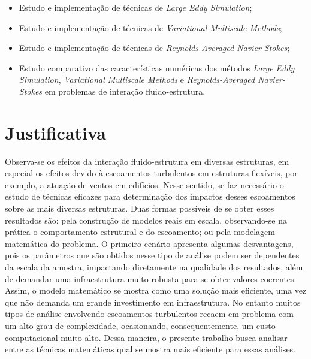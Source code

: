 \documentclass[_ArquivoPrincipal.tex]{subfiles}
\begin{document}
\begin{itemize}
    \item Estudo e implementação de técnicas de \textit{Large Eddy Simulation};

    \item Estudo e implementação de técnicas de \textit{Variational Multiscale Methods};

    \item Estudo e implementação de técnicas de \textit{Reynolds-Averaged Navier-Stokes};

    \item Estudo comparativo das características numéricas dos métodos \textit{Large Eddy Simulation}, \textit{Variational Multiscale Methods} e \textit{Reynolds-Averaged Navier-Stokes} em problemas de interação fluido-estrutura.
\end{itemize}

\section{Justificativa}

Observa-se os efeitos da interação fluido-estrutura em diversas estruturas, em especial os efeitos devido à escoamentos turbulentos em estruturas flexíveis, por exemplo, a atuação de ventos em edifícios. Nesse sentido, se faz necessário o estudo de técnicas eficazes para determinação dos impactos desses escoamentos sobre as mais diversas estruturas. Duas formas possíveis de se obter esses resultados são: pela construção de modelos reais em escala, observando-se na prática o comportamento estrutural e do escoamento; ou pela modelagem matemática do problema. O primeiro cenário apresenta algumas desvantagens, pois os parâmetros que são obtidos nesse tipo de análise podem ser dependentes da escala da amostra, impactando diretamente na qualidade dos resultados, além de demandar uma infraestrutura muito robusta para se obter valores coerentes. Assim, o modelo matemático se mostra como uma solução mais eficiente, uma vez que não demanda um grande investimento em infraestrutura. No entanto muitos tipos de análise envolvendo escoamentos turbulentos recaem em problema com um alto grau de complexidade, ocasionando, consequentemente, um custo computacional muito alto. Dessa maneira, o presente trabalho busca analisar entre as técnicas matemáticas qual se mostra mais eficiente para essas análises.
\end{document}
